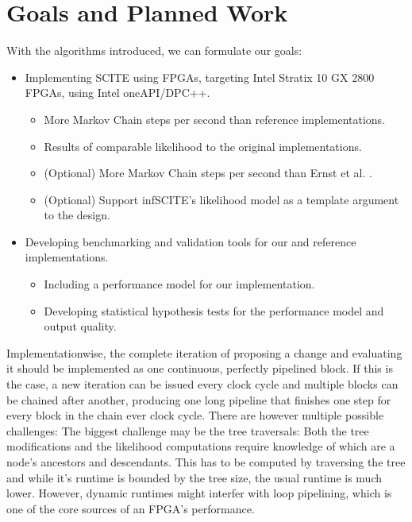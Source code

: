\section{Goals and Planned Work}

With the algorithms introduced, we can formulate our goals:
\begin{itemize}
    \item Implementing \ac{SCITE} using \acp{FPGA}, targeting Intel Stratix 10 GX 2800 \acp{FPGA}, using Intel oneAPI/DPC++.
    \begin{itemize}
        \item More Markov Chain steps per second than reference implementations.
        \item Results of comparable likelihood to the original implementations.
        \item (Optional) More Markov Chain steps per second than Ernst et al. \cite{ernst2020Performance}.
        \item (Optional) Support \ac{infSCITE}'s likelihood model as a template argument to the design.
    \end{itemize}
    \item Developing benchmarking and validation tools for our and reference implementations.
    \begin{itemize}
        \item Including a performance model for our implementation.
        \item Developing statistical hypothesis tests for the performance model and output quality.
    \end{itemize}
\end{itemize}

Implementationwise, the complete iteration of proposing a change and evaluating it should be implemented as one continuous, perfectly pipelined block. If this is the case, a new iteration can be issued every clock cycle and multiple blocks can be chained after another, producing one long pipeline that finishes one step for every block in the chain ever clock cycle. There are however multiple possible challenges: The biggest challenge may be the tree traversals: Both the tree modifications and the likelihood computations require knowledge of which are a node's ancestors and descendants. This has to be computed by traversing the tree and while it's runtime is bounded by the tree size, the usual runtime is much lower. However, dynamic runtimes might interfer with loop pipelining, which is one of the core sources of an \ac{FPGA}'s performance.

